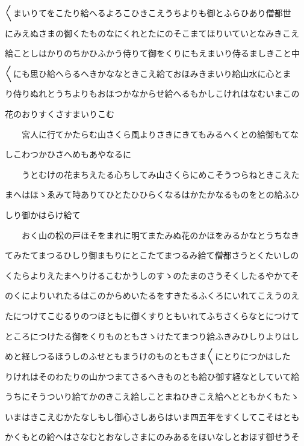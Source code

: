 \documentclass[a4paper,11pt,landscape]{ltjtarticle}
\begin{document}
\par\medskip
〱まいりてをこたり給へるよろこひきこえうちよりも御とふらひあり僧都世
\par\medskip
にみえぬさまの御くたものなにくれとたにのそこまてほりいていとなみきこえ
\par\medskip
給ことしはかりのちかひふかう侍りて御をくりにもえまいり侍るましきこと中
\par\medskip
〱にも思ひ給へらるへきかななときこえ給ておほみきまいり給山水に心とま
\par\medskip
り侍りぬれとうちよりもおほつかなからせ給へるもかしこけれはなむいまこの
\par\medskip
花のおりすくさすまいりこむ
\par\medskip
　　宮人に行てかたらむ山さくら風よりさきにきてもみるへくとの給御もてな
\par\medskip
しこわつかひさへめもあやなるに
\par\medskip
　　うとむけの花まちえたる心ちしてみ山さくらにめこそうつらねときこえた
\par\medskip
まへはほゝゑみて時ありてひとたひひらくなるはかたかなるものをとの給ふひ
\par\medskip
しり御かはらけ給て
\par\medskip
　　おく山の松の戸ほそをまれに明てまたみぬ花のかほをみるかなとうちなき
\par\medskip
てみたてまつるひしり御まもりにとこたてまつるみ給て僧都さうとくたいしの
\par\medskip
くたらよりえたまへりけるこむかうしのすゝのたまのさうそくしたるやかてそ
\par\medskip
のくによりいれたるはこのからめいたるをすきたるふくろにいれてこえうのえ
\par\medskip
たにつけてこむるりのつほともに御くすりともいれてふちさくらなとにつけて
\par\medskip
ところにつけたる御をくりものともさゝけたてまつり給ふきみひしりよりはし
\par\medskip
めと経しつるほうしのふせともまうけのものともさま〱にとりにつかはした
\par\medskip
りけれはそのわたりの山かつまてさるへきものとも給ひ御す経なとしていて給
\par\medskip
うちにそうついり給てかのきこえ給しことまねひきこえ給へとともかくもたゝ
\par\medskip
いまはきこえむかたなしもし御心さしあらはいま四五年をすくしてこそはとも
\par\medskip
かくもとの給へはさなむとおなしさまにのみあるをほいなしとおほす御せうそ
\par\medskip
\end{document}
